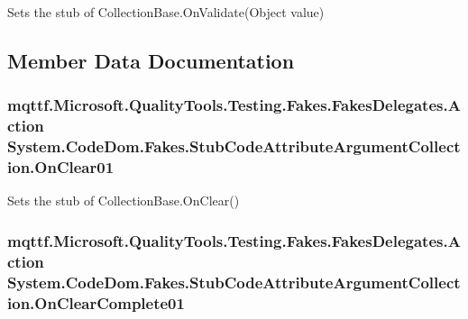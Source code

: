 Sets the stub of Collection\-Base.\-On\-Validate(\-Object value)



\subsection{Member Data Documentation}
\hypertarget{class_system_1_1_code_dom_1_1_fakes_1_1_stub_code_attribute_argument_collection_a3f2b51cc76d290eaf69d303758dd985e}{
\subsubsection[{On\-Clear01}]{\setlength{\rightskip}{0pt plus 5cm}mqttf.\-Microsoft.\-Quality\-Tools.\-Testing.\-Fakes.\-Fakes\-Delegates.\-Action System.\-Code\-Dom.\-Fakes.\-Stub\-Code\-Attribute\-Argument\-Collection.\-On\-Clear01}}\label{class_system_1_1_code_dom_1_1_fakes_1_1_stub_code_attribute_argument_collection_a3f2b51cc76d290eaf69d303758dd985e}


Sets the stub of Collection\-Base.\-On\-Clear()

\hypertarget{class_system_1_1_code_dom_1_1_fakes_1_1_stub_code_attribute_argument_collection_a76a3822c2a3d0d21c1aed7252d5afe8a}{
\subsubsection[{On\-Clear\-Complete01}]{\setlength{\rightskip}{0pt plus 5cm}mqttf.\-Microsoft.\-Quality\-Tools.\-Testing.\-Fakes.\-Fakes\-Delegates.\-Action System.\-Code\-Dom.\-Fakes.\-Stub\-Code\-Attribute\-Argument\-Collection.\-On\-Clear\-Complete01}}\label{class_system_1_1_code_dom_1_1_fakes_1_1_stub_code_attribute_argument_collection_a76a3822c2a3d0d21c1aed7252d5afe8a}


